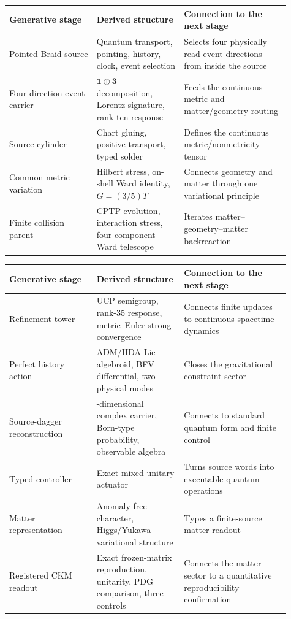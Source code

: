 \documentclass[11pt]{article}
\theoremstyle{definition}
\theoremstyle{remark}
\begin{document}
\begin{tabularx}{\linewidth}{>{\raggedright\arraybackslash}p{0.28\linewidth} >{\raggedright\arraybackslash}p{0.29\linewidth} >{\raggedright\arraybackslash}p{0.34\linewidth}}
\toprule
Generative stage & Derived structure & Connection to the next stage \\
\midrule
Pointed-Braid source & Quantum transport, pointing, history, clock, event selection & Selects four physically read event directions from inside the source \\
Four-direction event carrier & $\mathbf1\oplus\mathbf3$ decomposition, Lorentz signature, rank-ten response & Feeds the continuous metric and matter/geometry routing \\
Source cylinder & Chart gluing, positive transport, typed solder & Defines the continuous metric/nonmetricity tensor \\
Common metric variation & Hilbert stress, on-shell Ward identity, $G=(3/5)T$ & Connects geometry and matter through one variational principle \\
Finite collision parent & CPTP evolution, interaction stress, four-component Ward telescope & Iterates matter--geometry--matter backreaction \\
\bottomrule
\end{tabularx}

\newpage
\begin{tabularx}{\linewidth}{>{\raggedright\arraybackslash}p{0.28\linewidth} >{\raggedright\arraybackslash}p{0.29\linewidth} >{\raggedright\arraybackslash}p{0.34\linewidth}}
\toprule
Generative stage & Derived structure & Connection to the next stage \\
\midrule
Refinement tower & UCP semigroup, rank-35 response, metric--Euler strong convergence & Connects finite updates to continuous spacetime dynamics \\
Perfect history action & ADM/HDA Lie algebroid, BFV differential, two physical modes & Closes the gravitational constraint sector \\
Source-dagger reconstruction & 36-dimensional complex carrier, Born-type probability, observable algebra & Connects to standard quantum form and finite control \\
Typed controller & Exact mixed-unitary actuator & Turns source words into executable quantum operations \\
Matter representation & Anomaly-free character, Higgs/Yukawa variational structure & Types a finite-source matter readout \\
Registered CKM readout & Exact frozen-matrix reproduction, unitarity, PDG comparison, three controls & Connects the matter sector to a quantitative reproducibility confirmation \\
\bottomrule
\end{tabularx}
\end{document}
